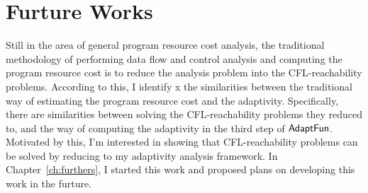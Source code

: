 \section{Furture Works}
\label{sec:intro-cfl}
Still in the area of general program resource cost analysis,
the traditional methodology of performing data flow and control analysis and 
computing the program resource cost is
to reduce the analysis problem into the CFL-reachability problems.
According to this, 
I identify x
the similarities between the traditional way of estimating the program resource cost and 
the adaptivity.
Specifically, there are similarities between solving the CFL-reachability problems they reduced to,
 and the way of computing the adaptivity in 
the third step of $\textsf{AdaptFun}$.
 Motivated by this, 
 I'm interested in showing that
 CFL-reachability problems can be solved by reducing to my adaptivity analysis framework.
In Chapter~\ref{ch:furthers}, I started this work and proposed plans on developing this work in the furture.




